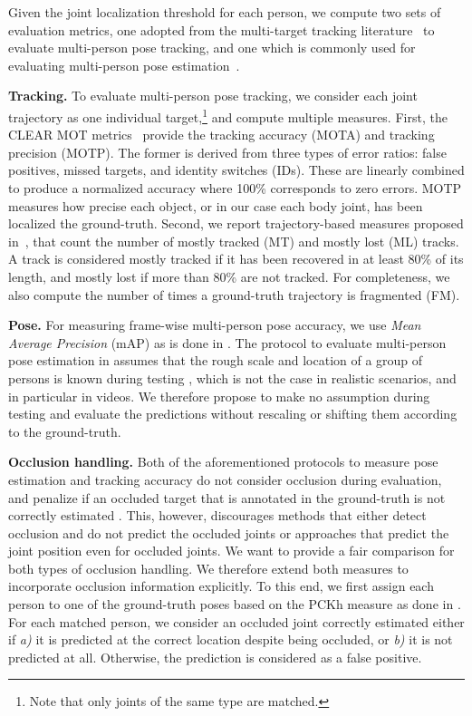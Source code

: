\documentclass[10pt,twocolumn,letterpaper]{article}
\begin{document}
Given the joint localization threshold for each person, we compute two sets of evaluation metrics, one adopted from the multi-target tracking literature~\cite{Yang:2012:CVPR, Choi:2015:ICCV, milan2016mot16} to evaluate multi-person pose tracking, and one which is commonly used for evaluating multi-person pose estimation~\cite{pishchulin2016deepcut}.

\noindent\textbf{Tracking.}
To evaluate multi-person pose tracking, we consider each joint trajectory as one individual target,\footnote{Note that only joints of the same type are matched.} and compute multiple measures.
First, the CLEAR MOT metrics~\cite{Bernardin:2008:CLE} provide the tracking accuracy (MOTA) and tracking precision (MOTP). The former is derived from three types of error ratios: false positives, missed targets, and identity switches (IDs). These are linearly combined to produce a normalized accuracy where 100\% corresponds to zero errors. MOTP measures how precise each object, or in our case each body joint, has been localized \wrt the ground-truth.
Second, we report trajectory-based measures proposed in~\cite{Li:2009:CVPR}, that count the number of mostly tracked (MT) and mostly lost (ML) tracks. A track is considered mostly tracked if it has been recovered in at least 80\% of its length, and mostly lost if more than 80\% are not tracked.
For completeness, we also compute the number of times a ground-truth trajectory is fragmented (FM). 

\noindent\textbf{Pose.}
For measuring frame-wise multi-person pose accuracy, we use \emph{Mean Average Precision} (mAP) as is done in \cite{pishchulin2016deepcut}.
The protocol to evaluate multi-person pose estimation in \cite{pishchulin2016deepcut} assumes that the rough scale and location of a group of persons is known during testing \cite{pishchulin2016deepcut}, which is not the case in realistic scenarios, and in particular in videos. We therefore propose to make no assumption during testing and evaluate the predictions without rescaling or shifting them according to the ground-truth.

\noindent\textbf{Occlusion handling.}
Both of the aforementioned protocols to measure pose estimation and tracking accuracy do not consider occlusion during evaluation, and penalize if an occluded target that is annotated in the ground-truth is not correctly estimated \cite{milan2016mot16, pishchulin2016deepcut}. This, however, discourages methods that either detect occlusion and do not predict the occluded joints or approaches that predict the joint position even for occluded joints. We want to provide a fair comparison for both types of occlusion handling. We therefore extend both measures to incorporate occlusion information explicitly. To this end, we first assign each person to one of the ground-truth poses based on the PCKh measure as done in \cite{pishchulin2016deepcut}. For each matched person, we consider an occluded joint correctly estimated 
either if \emph{a)} it is predicted at the correct location despite being occluded,
or \emph{b)} it is not predicted at all. Otherwise, the prediction is considered as a false positive. 
\end{document}
